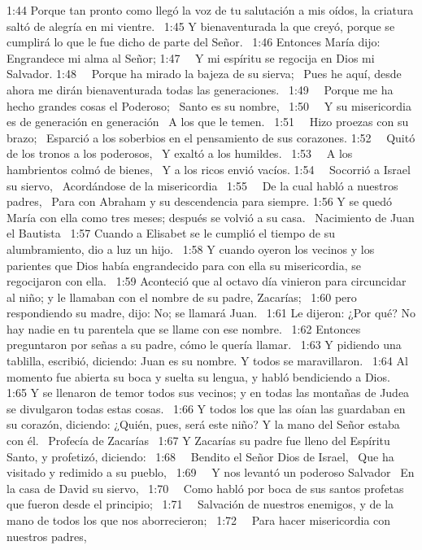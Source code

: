 1:44 Porque tan pronto como llegó la voz de tu salutación a mis oídos, la criatura saltó de alegría en mi vientre.  
1:45 Y bienaventurada la que creyó, porque se cumplirá lo que le fue dicho de parte del Señor.  
1:46 Entonces María dijo: 
Engrandece mi alma al Señor; 
1:47   Y mi espíritu se regocija en Dios mi Salvador. 
1:48   Porque ha mirado la bajeza de su sierva;  
Pues he aquí, desde ahora me dirán bienaventurada todas las generaciones.  
1:49   Porque me ha hecho grandes cosas el Poderoso;  
Santo es su nombre,  
1:50   Y su misericordia es de generación en generación  
A los que le temen.  
1:51   Hizo proezas con su brazo;  
Esparció a los soberbios en el pensamiento de sus corazones. 
1:52   Quitó de los tronos a los poderosos,  
Y exaltó a los humildes.  
1:53   A los hambrientos colmó de bienes,  
Y a los ricos envió vacíos. 
1:54   Socorrió a Israel su siervo,  
Acordándose de la misericordia  
1:55   De la cual habló a nuestros padres,  
Para con Abraham y su descendencia para siempre. 
1:56 Y se quedó María con ella como tres meses; después se volvió a su casa.  
Nacimiento de Juan el Bautista  
1:57 Cuando a Elisabet se le cumplió el tiempo de su alumbramiento, dio a luz un hijo.  
1:58 Y cuando oyeron los vecinos y los parientes que Dios había engrandecido para con ella su misericordia, se regocijaron con ella.  
1:59 Aconteció que al octavo día vinieron para circuncidar al niño; y le llamaban con el nombre de su padre, Zacarías;  
1:60 pero respondiendo su madre, dijo: No; se llamará Juan.  
1:61 Le dijeron: ¿Por qué? No hay nadie en tu parentela que se llame con ese nombre.  
1:62 Entonces preguntaron por señas a su padre, cómo le quería llamar.  
1:63 Y pidiendo una tablilla, escribió, diciendo: Juan es su nombre. Y todos se maravillaron.  
1:64 Al momento fue abierta su boca y suelta su lengua, y habló bendiciendo a Dios.  
1:65 Y se llenaron de temor todos sus vecinos; y en todas las montañas de Judea se divulgaron todas estas cosas.  
1:66 Y todos los que las oían las guardaban en su corazón, diciendo: ¿Quién, pues, será este niño? Y la mano del Señor estaba con él.  
Profecía de Zacarías  
1:67 Y Zacarías su padre fue lleno del Espíritu Santo, y profetizó, diciendo:  
1:68   Bendito el Señor Dios de Israel,  
Que ha visitado y redimido a su pueblo,  
1:69   Y nos levantó un poderoso Salvador  
En la casa de David su siervo,  
1:70   Como habló por boca de sus santos profetas que fueron desde el principio;  
1:71   Salvación de nuestros enemigos, y de la mano de todos los que nos aborrecieron;  
1:72   Para hacer misericordia con nuestros padres,  
